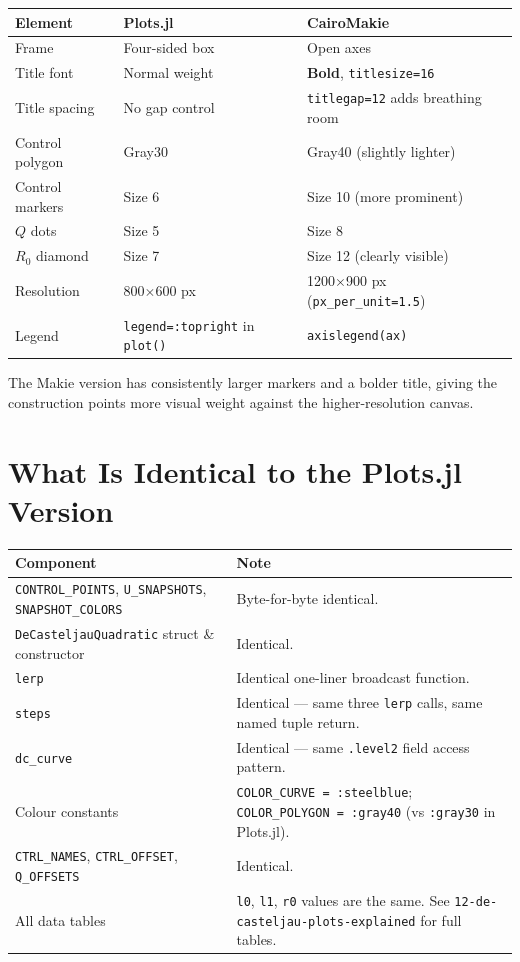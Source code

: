 \documentclass[12pt, a4paper]{article}
\newcommand{\cd}[1]{\texttt{#1}}
\begin{document}
\begin{center}
\begin{tabular}{lll}
\toprule
Element & Plots.jl & CairoMakie \\
\midrule
Frame & Four-sided box & Open axes \\
Title font & Normal weight & \textbf{Bold}, \cd{titlesize=16} \\
Title spacing & No gap control & \cd{titlegap=12} adds breathing room \\
Control polygon & Gray30 & Gray40 (slightly lighter) \\
Control markers & Size 6 & Size 10 (more prominent) \\
$Q$ dots & Size 5 & Size 8 \\
$R_0$ diamond & Size 7 & Size 12 (clearly visible) \\
Resolution & 800$\times$600 px & 1200$\times$900 px (\cd{px\_per\_unit=1.5}) \\
Legend & \cd{legend=:topright} in \cd{plot()} & \cd{axislegend(ax)} \\
\bottomrule
\end{tabular}
\end{center}

The Makie version has consistently larger markers and a
bolder title, giving the construction points more visual
weight against the higher-resolution canvas.


\section{What Is Identical to the Plots.jl Version}

\begin{samebox}
\begin{tabular}{lp{9.5cm}}
\toprule
Component & Note \\
\midrule
\cd{CONTROL\_POINTS}, \cd{U\_SNAPSHOTS}, \cd{SNAPSHOT\_COLORS} &
  Byte-for-byte identical. \\
\cd{DeCasteljauQuadratic} struct \& constructor &
  Identical. \\
\cd{lerp} &
  Identical one-liner broadcast function. \\
\cd{steps} &
  Identical --- same three \cd{lerp} calls, same named tuple return. \\
\cd{dc\_curve} &
  Identical --- same \cd{.level2} field access pattern. \\
Colour constants &
  \cd{COLOR\_CURVE = :steelblue}; \cd{COLOR\_POLYGON = :gray40}
  (vs \cd{:gray30} in Plots.jl). \\
\cd{CTRL\_NAMES}, \cd{CTRL\_OFFSET}, \cd{Q\_OFFSETS} &
  Identical. \\
All data tables &
  \cd{l0}, \cd{l1}, \cd{r0} values are the same.
  See \cd{12-de-casteljau-plots-explained} for full tables. \\
\bottomrule
\end{tabular}
\end{samebox}
\end{document}
